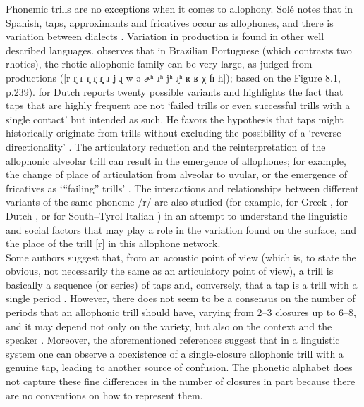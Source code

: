 Phonemic trills are no exceptions when it comes to allophony. Solé \parencite*[412]{solePhonologicalUniversalsTrilling1998} notes that in Spanish, taps, approximants and fricatives occur as allophones, and there is variation between dialects \parencite{pennyVariationChangeSpanish2000}. Variation in production is found in other well described languages. \textcite{rennickeVariationChangeRhotics2015} observes that in Brazilian Portuguese (which contrasts two rhotics), the rhotic allophonic family can be very large, as judged from productions ([r r̥ ɾ ɾ̥ ɾ̞ ɾ̞̥ ɹ j ɻ w ə ɚʰ ɹʰ jʰ ɻʰ ʀ ʁ χ ɦ h]); based on the Figure 8.1, p.239). \textcite{sebregtsSociophoneticsPhonologyDutch2014} for Dutch reports twenty possible variants and highlights the fact that taps that are highly frequent are not ‘failed trills or even successful trills with a single contact’ but intended as such. He favors the hypothesis that taps might historically originate from trills without excluding the possibility of a ‘reverse directionality’ \parencite[179]{sebregtsSociophoneticsPhonologyDutch2014}. The articulatory reduction and the reinterpretation of the allophonic alveolar trill can result in the emergence of allophones; for example, the change of place of articulation from alveolar to uvular, or the emergence of fricatives as ‘“failing” trills’ \parencite[412--413]{solePhonologicalUniversalsTrilling1998}. The interactions and relationships between different variants of the same phoneme /r/ are also studied (for example, for Greek \parencite{baltazaniManyFaces2013}, for Dutch \parencite{sebregtsSociophoneticsPhonologyDutch2014}, or for South–Tyrol Italian \parencite{spreaficoSociophoneticsBozenModelling2016}) in an attempt to understand the linguistic and social factors that may play a role in the variation found on the surface, and the place of the trill [r] in this allophone network.\\

Some authors suggest that, from an acoustic point of view (which is, to state the obvious, not necessarily the same as an articulatory point of view), a trill is basically a sequence (or series) of taps and, conversely, that a tap is a trill with a single period \parencite{lindauStory1985,ladefogedSoundsWorldLanguages1996}. However, there does not seem to be a consensus on the number of periods that an allophonic trill should have, varying from 2–3 closures up to 6–8, and it may depend not only on the variety, but also on the context and the speaker \parencite{henriksenAcousticCharacterizationPhonemic2010}. Moreover, the aforementioned references suggest that in a linguistic system one can observe a coexistence of a single-closure allophonic trill with a genuine tap, leading to another source of confusion. The phonetic alphabet does not capture these fine differences in the number of closures in part because there are no conventions on how to represent them.\\

